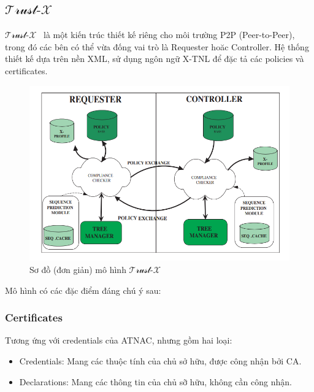\documentclass[12pt]{article}
\newcommand{\trustx}{$\mathcal{\text{Trust-}X}$\ }
\begin{document}
\subsection{\trustx}
\trustx\cite{10.1109/TKDE.2004.1318565} là một kiến trúc thiết kế riêng cho môi trường P2P (Peer-to-Peer), trong đó các bên có thể vừa đống vai trò là Requester hoăc Controller. Hệ thống thiết kế dựa trên nền XML, sử dụng ngôn ngữ X-TNL để đặc tả các policies và certificates. 

\begin{figure}[H]
\centering
\includegraphics[scale=.8]{img/trust-x-architecture.png}
\caption{Sơ đồ (đơn giản) mô hình \trustx}
\end{figure}

Mô hình có các đặc điểm đáng chú ý sau:

\subsubsection{Certificates}
Tương ứng với credentials của ATNAC, nhưng gồm hai loại:
\begin{itemize}
\item Credentials: Mang các thuộc tính của chủ sở hữu, được công nhận bởi CA.
\item Declarations: Mang các thông tin của chủ sỡ hữu, không cần công nhận.
\end{itemize}
\end{document}
